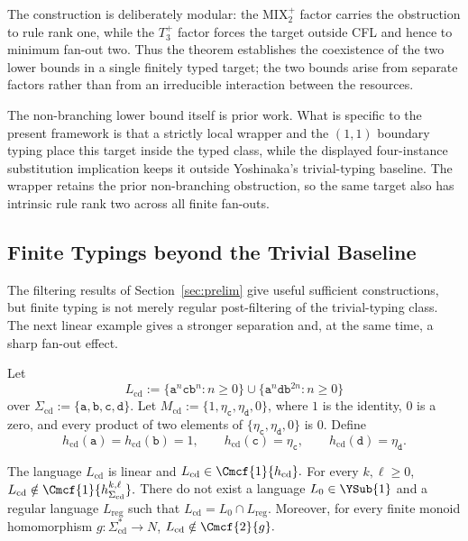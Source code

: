 The construction is deliberately modular: the $\mathrm{MIX}_2^+$ factor
carries the obstruction to rule rank one, while the $T_3^+$ factor forces the
target outside CFL and hence to minimum fan-out two.  Thus the theorem
establishes the coexistence of the two lower bounds in a single finitely typed
target; the two bounds arise from separate factors rather than from an
irreducible interaction between the resources.

The non-branching lower bound itself is prior work.  What is specific to the
present framework is that a strictly local wrapper and the $(1,1)$ boundary
typing place this target inside the typed class, while the displayed four-instance substitution implication keeps it outside Yoshinaka's trivial-typing baseline.
The wrapper retains the prior non-branching obstruction, so the same target
also has intrinsic rule rank two across all finite fan-outs.

\subsection{Finite Typings beyond the Trivial Baseline}
\label{subsec:finite-typing-separations}


The filtering results of Section~\ref{sec:prelim} give useful sufficient
constructions, but finite typing is not merely regular post-filtering of the
trivial-typing class.  The next linear example gives a stronger separation and,
at the same time, a sharp fan-out effect.

Let
\[
  L_{\mathrm{cd}}:=
  \{\mathtt a^n\mathtt c\mathtt b^n:n\ge0\}
  \cup
  \{\mathtt a^n\mathtt d\mathtt b^{2n}:n\ge0\}
\]
over $\Sigma_{\mathrm{cd}}:=\{\mathtt a,\mathtt b,\mathtt c,\mathtt d\}$.  Let
$M_{\mathrm{cd}}:=\{1,\eta_{\mathtt c},\eta_{\mathtt d},0\}$, where $1$ is the identity, $0$ is a zero,
and every product of two elements of $\{\eta_{\mathtt c},\eta_{\mathtt d},0\}$ is $0$.  Define
\[
 h_{\mathrm{cd}}(\mathtt a)=h_{\mathrm{cd}}(\mathtt b)=1,
 \qquad
 h_{\mathrm{cd}}(\mathtt c)=\eta_{\mathtt c},
 \qquad
 h_{\mathrm{cd}}(\mathtt d)=\eta_{\mathtt d}.
\]

\begin{proposition}
\label{prop:strong-fanout-separation}
The language $L_{\mathrm{cd}}$ is linear and
\(L_{\mathrm{cd}}\in\Cmcf{1}{h_{\mathrm{cd}}}.\)
For every $k,\ell\ge0$,
\(L_{\mathrm{cd}}\notin\Cmcf{1}{h_{\Sigma_{\mathrm{cd}}}^{k,\ell}}.\)
There do not exist a language $L_0\in \YSub{1}$ and a regular language
$L_{\mathrm{reg}}$ such that
$L_{\mathrm{cd}}=L_0\cap L_{\mathrm{reg}}$.  Moreover, for every finite monoid
homomorphism $g:\Sigma_{\mathrm{cd}}^*\to N$,
\(L_{\mathrm{cd}}\notin\Cmcf{2}{g}.\)
\end{proposition}

